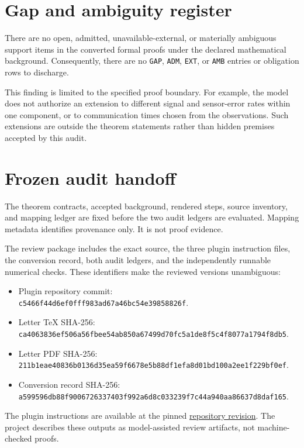 \documentclass[11pt,letterpaper]{article}
\begin{document}
\section{Gap and ambiguity register}
There are no open, admitted, unavailable-external, or materially ambiguous support items in the converted formal proofs under the declared mathematical background. Consequently, there are no \texttt{GAP}, \texttt{ADM}, \texttt{EXT}, or \texttt{AMB} entries or obligation rows to discharge.

This finding is limited to the specified proof boundary. For example, the model does not authorize an extension to different signal and sensor-error rates within one component, or to communication times chosen from the observations. Such extensions are outside the theorem statements rather than hidden premises accepted by this audit.

\clearpage
\section{Frozen audit handoff}
The theorem contracts, accepted background, rendered steps, source inventory, and mapping ledger are fixed before the two audit ledgers are evaluated. Mapping metadata identifies provenance only. It is not proof evidence.

The review package includes the exact source, the three plugin instruction files, the conversion record, both audit ledgers, and the independently runnable numerical checks. These identifiers make the reviewed versions unambiguous:

\begin{itemize}
\item Plugin repository commit:\\ \nolinkurl{c5466f44d6ef0fff983ad67a46bc54e39858826f}.
\item Letter TeX SHA-256:\\ \nolinkurl{ca4063836ef506a56fbee54ab850a67499d70fc5a1de8f5c4f8077a1794f8db5}.
\item Letter PDF SHA-256:\\ \nolinkurl{211b1eae40836b0136d35ea59f6678e5b88df1efa8d01bd100a2ee1f229bf0ef}.
\item Conversion record SHA-256:\\ \nolinkurl{a599596db88f9006726337403f992a6d8c033239f7c44a940aa86637d8daf165}.
\end{itemize}
The plugin instructions are available at the pinned \href{https://github.com/WWresearch/lamport-proof/tree/c5466f44d6ef0fff983ad67a46bc54e39858826f/skills}{repository revision}. The project describes these outputs as model-assisted review artifacts, not machine-checked proofs.
\end{document}

